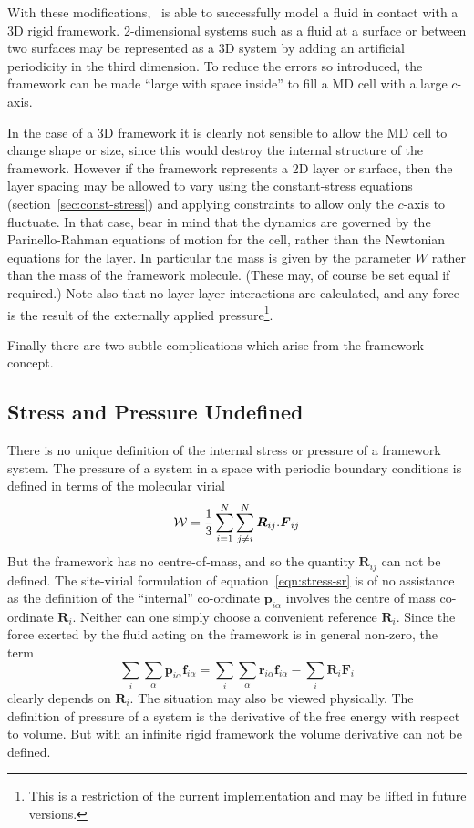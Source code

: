 With these modifications, \moldy\ is able to successfully model a fluid
in contact with a 3D rigid framework. 2-dimensional systems such as a
fluid at a surface or between two surfaces may be represented as a 3D
system by adding an artificial periodicity in the third dimension. To
reduce the errors so introduced, the framework can be made ``large
with space inside'' to fill a MD cell with a large $c$-axis.  

In the case of a 3D framework it is clearly not sensible to allow the
MD cell to change shape or size, since this would destroy the internal
structure of the framework.  However if the framework represents a 2D
layer or surface, then the layer spacing may be allowed to vary using
the constant-stress equations (section~\ref{sec:const-stress}) and
applying constraints to allow only the $c$-axis to fluctuate.  In that
case, bear in mind that the dynamics are governed by the
Parinello-Rahman equations of motion for the cell, rather than the
Newtonian equations for the layer.  In particular the mass is given by
the parameter $W$ rather than the mass of the framework molecule.
(These may, of course be set equal if required.)  Note also that no
layer-layer interactions are calculated, and any force is the result
of the externally applied pressure\footnote{This is a restriction of
the current implementation and may be lifted in future versions.}.

Finally there are two subtle complications which arise from the
framework concept.

\subsection{Stress and Pressure Undefined}
There is no unique definition of the internal stress or pressure of a
framework system.    The pressure of a system in a space with periodic
boundary conditions  is defined in terms of the molecular virial
\begin{equation}
\label{eqn:virial}
{\cal W} = \frac{1}{3} \sum_{i=1}^N \sum_{j \neq i}^N \mbox{\boldmath \protect\(R\protect\)}_{ij}.\mbox{\boldmath \protect\(F\protect\)}_{ij}
\end{equation}
But the framework has no centre-of-mass, and so the quantity
$\bm{R}_{ij}$ can not be defined.  The site-virial formulation of
equation~\ref{eqn:stress-sr} is of no assistance as the definition of the
``internal'' co-ordinate $\bm{p}_{i\alpha}$ involves the centre of
mass co-ordinate $\bm{R}_i$.  Neither can one simply choose a
convenient reference $\bm{R}_i$.  Since the force exerted by the fluid
acting on the framework is in general non-zero, the term
\begin{equation}
\sum_i \sum_\alpha \bm{p}_{i\alpha} \bm{f}_{i\alpha}
= \sum_i \sum_\alpha \bm{r}_{i\alpha} \bm{f}_{i\alpha}
- \sum_i \bm{R}_i \bm{F}_i
\end{equation}
clearly depends on $\bm{R}_i$.  The situation may also be viewed
physically.  The definition of pressure of a system is the derivative
of the free energy with respect to volume.  But with an infinite rigid
framework the volume derivative can not be defined.


